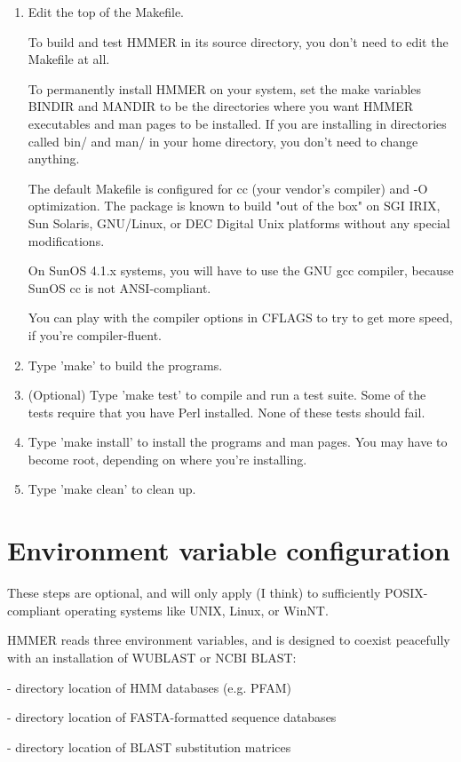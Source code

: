 \begin{enumerate}
\item Edit the top of the Makefile. 

To build and test HMMER in its source directory, you don't need to
edit the Makefile at all. 

To permanently install HMMER on your system, set the make variables
BINDIR and MANDIR to be the directories where you want HMMER
executables and man pages to be installed. If you are installing in
directories called bin/ and man/ in your home directory, you don't
need to change anything.

The default Makefile is configured for cc (your vendor's compiler) and
-O optimization. The package is known to build "out of the box" on SGI
IRIX, Sun Solaris, GNU/Linux, or DEC Digital Unix platforms without
any special modifications. 

On SunOS 4.1.x systems, you will have to use the GNU gcc compiler,
because SunOS cc is not ANSI-compliant.

You can play with the compiler options in CFLAGS to try to get more
speed, if you're compiler-fluent. 

\item Type 'make' to build the programs.

\item (Optional) Type 'make test' to compile and run a test suite.
Some of the tests require that you have Perl installed. None of these
tests should fail.

\item Type 'make install' to install the programs and man pages. 
You may have to become root, depending on where you're installing.

\item Type 'make clean' to clean up.
\end{enumerate}

\section{Environment variable configuration}

These steps are optional, and will only apply (I think) to
sufficiently POSIX-compliant operating systems like UNIX, Linux, or
WinNT.

HMMER reads three environment variables, and is designed to coexist
peacefully with an installation of WUBLAST or NCBI BLAST:

\begin{wideitem}
\item[\emprog{HMMERDB}] - directory location of HMM databases (e.g. PFAM)
\item[\emprog{BLASTDB}] - directory location of FASTA-formatted sequence databases
\item[\emprog{BLASTMAT}] - directory location of BLAST substitution matrices
\end{wideitem}

